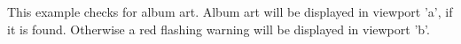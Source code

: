 \begin{example}
\end{example}
This example checks for album art. Album art will be displayed in viewport 'a', if
it is found. Otherwise a red flashing warning will be displayed in viewport 'b'.
